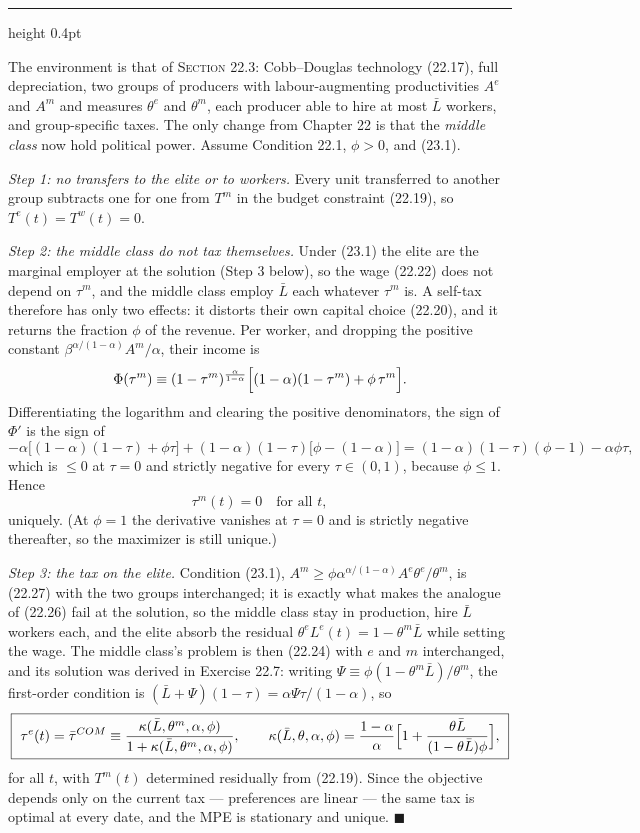 \documentclass[11pt,letterpaper,reqno]{amsart}
\makeatletter
\newcommand{\as@head}[3]{%
  \par\addvspace{1.6ex}\penalty-200\relax
  \phantomsection
  \addcontentsline{toc}{subsection}{#1 #2\texorpdfstring{\ifx\relax#3\relax\else\quad #3\fi}{}}%
  {\color{RuleGrey}\hrule height 0.4pt}%
  \nobreak\vspace{0.8ex}\nobreak
  \noindent{\bfseries #1 #2}%
  \ifx\relax#3\relax\else\quad{\bfseries\itshape #3}\fi
  \par\nobreak\vspace{0.4ex}\nobreak
  \as@beginstatement
}
\newcommand{\as@beginstatement}{\begingroup\itshape\ignorespaces}
\newenvironment{aex}[2]{\as@head{Exercise}{#1}{#2}}{\par\addvspace{1.2ex}}
\newcommand{\bk}[1]{\textup{\textsc{#1}}}
\renewcommand{\as@beginstatement}{\ignorespaces}
\makeatother
\begin{document}
\begin{aex}{23.1}{}
The environment is that of \bk{Section 22.3}: Cobb--Douglas technology \bk{(22.17)}, full
depreciation, two groups of producers with labour-augmenting productivities $A^e$ and $A^m$ and
measures $\theta^e$ and $\theta^m$, each producer able to hire at most $\bar L$ workers, and
group-specific taxes.  The only change from Chapter 22 is that the \emph{middle class} now hold
political power.  Assume Condition 22.1, $\phi>0$, and \bk{(23.1)}.

\emph{Step 1: no transfers to the elite or to workers.}  Every unit transferred to another group
subtracts one for one from $T^m$ in the budget constraint \bk{(22.19)}, so $T^e(t)=T^w(t)=0$.

\emph{Step 2: the middle class do not tax themselves.}  Under \bk{(23.1)} the elite are the
marginal employer at the solution (Step 3 below), so the wage \bk{(22.22)} does not depend on
$\tau^m$, and the middle class employ $\bar L$ each whatever $\tau^m$ is.  A self-tax therefore
has only two effects: it distorts their own capital choice \bk{(22.20)}, and it returns the
fraction $\phi$ of the revenue.  Per worker, and dropping the positive constant
$\beta^{\alpha/(1-\alpha)}A^m/\alpha$, their income is
\[
\Phi(\tau^m)\equiv(1-\tau^m)^{\frac{\alpha}{1-\alpha}}
\Bigl[(1-\alpha)(1-\tau^m)+\phi\,\tau^m\Bigr] .
\]
Differentiating the logarithm and clearing the positive denominators, the sign of $\Phi'$ is the
sign of
\[
-\alpha\bigl[(1-\alpha)(1-\tau)+\phi\tau\bigr]+(1-\alpha)(1-\tau)\bigl[\phi-(1-\alpha)\bigr]
=(1-\alpha)(1-\tau)(\phi-1)-\alpha\phi\tau ,
\]
which is $\le0$ at $\tau=0$ and strictly negative for every $\tau\in(0,1)$, because $\phi\le1$.
Hence
\[
\boxed{\ \tau^m(t)=0\quad\text{for all }t , \ }
\]
uniquely.  (At $\phi=1$ the derivative vanishes at $\tau=0$ and is strictly negative thereafter,
so the maximizer is still unique.)

\emph{Step 3: the tax on the elite.}  Condition \bk{(23.1)},
$A^m\ge\phi\alpha^{\alpha/(1-\alpha)}A^e\theta^e/\theta^m$, is \bk{(22.27)} with the two groups
interchanged; it is exactly what makes the analogue of \bk{(22.26)} fail at the solution, so the
middle class stay in production, hire $\bar L$ workers each, and the elite absorb the residual
$\theta^eL^e(t)=1-\theta^m\bar L$ while setting the wage.  The middle class's problem is then
\bk{(22.24)} with $e$ and $m$ interchanged, and its solution was derived in Exercise 22.7:
writing $\Psi\equiv\phi(1-\theta^m\bar L)/\theta^m$, the first-order condition is
$(\bar L+\Psi)(1-\tau)=\alpha\Psi\tau/(1-\alpha)$, so
\[
\boxed{\ \tau^e(t)=\bar\tau^{COM}\equiv
\frac{\kappa(\bar L,\theta^m,\alpha,\phi)}{1+\kappa(\bar L,\theta^m,\alpha,\phi)},
\qquad
\kappa(\bar L,\theta,\alpha,\phi)=\frac{1-\alpha}{\alpha}
\Bigl[1+\frac{\theta\bar L}{(1-\theta\bar L)\phi}\Bigr] , \ }
\]
for all $t$, with $T^m(t)$ determined residually from \bk{(22.19)}.  Since the objective depends
only on the current tax --- preferences are linear --- the same tax is optimal at every date, and
the MPE is stationary and unique. $\blacksquare$


\end{aex}
\end{document}

